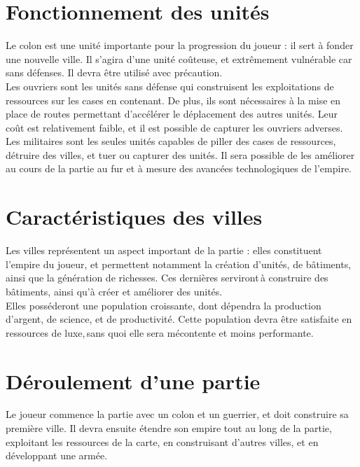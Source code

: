 \documentclass[12pt]{report}
\begin{document}
\newpage

\section{Fonctionnement des unités}

Le colon est une unité importante pour la progression du joueur : il sert à fonder une nouvelle ville. Il s'agira d'une unité coûteuse, et extrêmement vulnérable car sans défenses. Il devra être utilisé avec précaution.\\

Les ouvriers sont les unités sans défense qui construisent les exploitations de ressources sur les cases en contenant. De plus, ils sont nécessaires à la mise en place de routes permettant d’accélérer le déplacement des autres unités. Leur coût est relativement faible, et il est possible de capturer les ouvriers adverses.\\

Les militaires sont les seules unités capables de piller des cases de ressources, détruire des villes, et tuer ou capturer des unités. Il sera possible de les améliorer au cours de la partie au fur et à mesure des avancées technologiques de l’empire.\\

\section{Caractéristiques des villes}

Les villes représentent un aspect important de la partie : elles constituent l'empire du joueur, et permettent notamment la création d'unités, de bâtiments, ainsi que la génération de richesses. Ces dernières serviront à construire des bâtiments, ainsi qu’à créer et améliorer des unités.\\

Elles posséderont une population croissante, dont dépendra la production d'argent, de science, et de productivité. Cette population devra être satisfaite en ressources de luxe, sans quoi elle sera mécontente et moins performante.

\newpage

\section{Déroulement d'une partie}

Le joueur commence la partie avec un colon et un guerrier, et doit construire sa première ville. Il devra ensuite étendre son empire tout au long de la partie, exploitant les ressources de la carte, en construisant d'autres villes, et en développant une armée.\\
\end{document}
